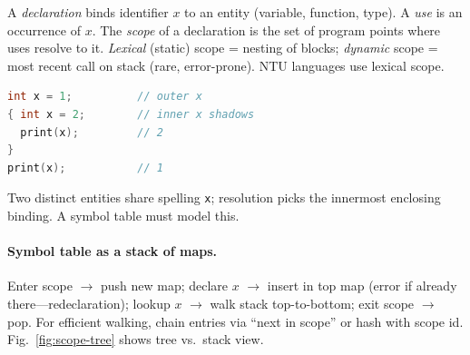 \begin{definition}
A \emph{declaration} binds identifier $x$ to an entity (variable, function, type). A \emph{use} is an occurrence of $x$. The \emph{scope} of a declaration is the set of program points where uses resolve to it. \emph{Lexical} (static) scope = nesting of blocks; \emph{dynamic} scope = most recent call on stack (rare, error-prone). NTU languages use lexical scope.
\end{definition}

\begin{example}[Shadowing]
\begin{lstlisting}[language=C]
int x = 1;          // outer x
{ int x = 2;        // inner x shadows
  print(x);         // 2
}
print(x);           // 1
\end{lstlisting}
Two distinct entities share spelling \texttt{x}; resolution picks the innermost enclosing binding. A symbol table must model this.
\end{example}

\paragraph{Symbol table as a stack of maps.} Enter scope $\to$ push new map; declare $x$ $\to$ insert in top map (error if already there---redeclaration); lookup $x$ $\to$ walk stack top-to-bottom; exit scope $\to$ pop. For efficient walking, chain entries via ``next in scope'' or hash with scope id. Fig.~\ref{fig:scope-tree} shows tree vs.\ stack view.

